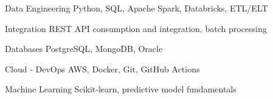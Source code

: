 
\begin{cvskills}

\cvskill
{Data Engineering}
{Python, SQL, Apache Spark, Databricks, ETL/ELT}

\cvskill
{Integration}
{REST API consumption and integration, batch processing}

\cvskill
{Databases}
{PostgreSQL, MongoDB, Oracle}

\cvskill
{Cloud - DevOps}
{AWS, Docker, Git, GitHub Actions}

\cvskill
{Machine Learning}
{Scikit-learn, predictive model fundamentals}

\end{cvskills}

